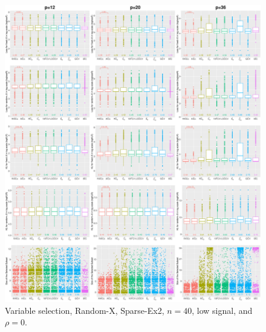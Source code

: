 \begin{figure}[!ht]
\centering
\includegraphics[width=\textwidth]{figures/supplement/randomx/subset_selection/Sparse-Ex2_n40_lsnr_rho0.eps}
\caption{Variable selection, Random-X, Sparse-Ex2, $n=40$, low signal, and $\rho=0$.}
\end{figure}
\clearpage
